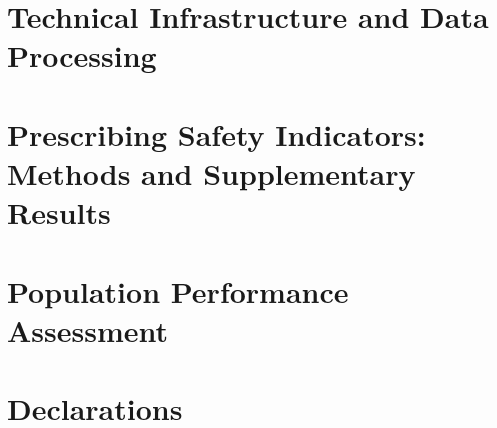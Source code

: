 \documentclass[12pt]{article}
\begin{document}
\begin{appendices}
\clearpage
\section{Technical Infrastructure and Data Processing}


\clearpage
\section{Prescribing Safety Indicators: Methods and Supplementary Results}


\clearpage
\section{Population Performance Assessment}


\section{Declarations}
\label{sec:declaration}



\end{appendices}
\end{document}
